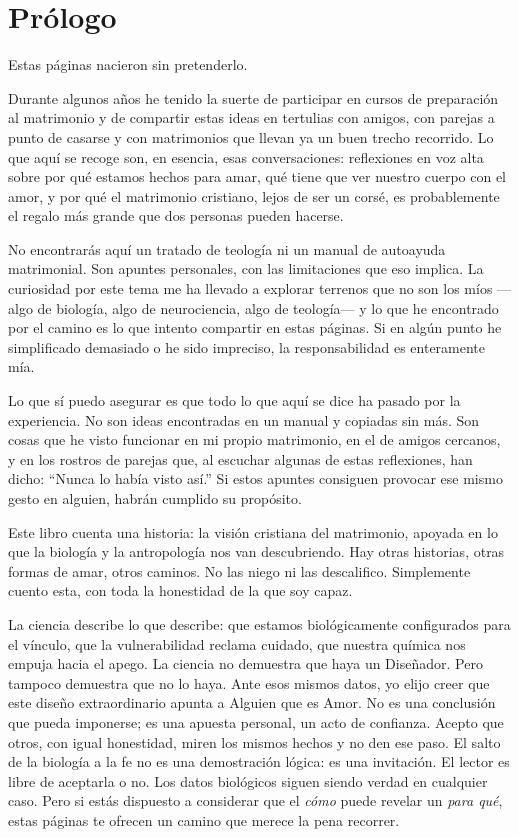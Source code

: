 \documentclass[11pt]{book}
\begin{document}
\chapter*{Prólogo}


Estas páginas nacieron sin pretenderlo.

Durante algunos años he tenido la suerte de participar en cursos de preparación al matrimonio y de compartir estas ideas en tertulias con amigos, con parejas a punto de casarse y con matrimonios que llevan ya un buen trecho recorrido. Lo que aquí se recoge son, en esencia, esas conversaciones: reflexiones en voz alta sobre por qué estamos hechos para amar, qué tiene que ver nuestro cuerpo con el amor, y por qué el matrimonio cristiano, lejos de ser un corsé, es probablemente el regalo más grande que dos personas pueden hacerse.

No encontrarás aquí un tratado de teología ni un manual de autoayuda matrimonial. Son apuntes personales, con las limitaciones que eso implica. La curiosidad por este tema me ha llevado a explorar terrenos que no son los míos ---algo de biología, algo de neurociencia, algo de teología--- y lo que he encontrado por el camino es lo que intento compartir en estas páginas. Si en algún punto he simplificado demasiado o he sido impreciso, la responsabilidad es enteramente mía.

Lo que sí puedo asegurar es que todo lo que aquí se dice ha pasado por la experiencia. No son ideas encontradas en un manual y copiadas sin más. Son cosas que he visto funcionar en mi propio matrimonio, en el de amigos cercanos, y en los rostros de parejas que, al escuchar algunas de estas reflexiones, han dicho: ``Nunca lo había visto así.'' Si estos apuntes consiguen provocar ese mismo gesto en alguien, habrán cumplido su propósito.

Este libro cuenta una historia: la visión cristiana del matrimonio, apoyada en lo que la biología y la antropología nos van descubriendo. Hay otras historias, otras formas de amar, otros caminos. No las niego ni las descalifico. Simplemente cuento esta, con toda la honestidad de la que soy capaz.

La ciencia describe lo que describe: que estamos biológicamente configurados para el vínculo, que la vulnerabilidad reclama cuidado, que nuestra química nos empuja hacia el apego. La ciencia no demuestra que haya un Diseñador. Pero tampoco demuestra que no lo haya. Ante esos mismos datos, yo elijo creer que este diseño extraordinario apunta a Alguien que es Amor. No es una conclusión que pueda imponerse; es una apuesta personal, un acto de confianza. Acepto que otros, con igual honestidad, miren los mismos hechos y no den ese paso. El salto de la biología a la fe no es una demostración lógica: es una invitación. El lector es libre de aceptarla o no. Los datos biológicos siguen siendo verdad en cualquier caso. Pero si estás dispuesto a considerar que el \emph{cómo} puede revelar un \emph{para qué}, estas páginas te ofrecen un camino que merece la pena recorrer.
\end{document}
